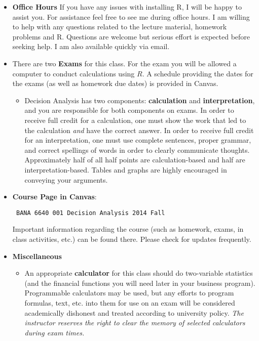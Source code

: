 \documentclass[11pt]{article}
\begin{document}
\begin{itemize}
\item[] \textbf{Office Hours} If you have any issues with installing R, I will be happy to assist you. For assistance feel free to see me during office hours.  I am willing to help with any questions related to the lecture material, homework problems and R. Questions are welcome but serious effort is expected before seeking help.  I am also available quickly via email.  \\

\item[] There are two \textbf{Exams} for this class.  For the exam you will be allowed a computer to conduct calculations using $R$. A schedule providing the dates for the exams (as well as homework due dates) is provided in Canvas.
\begin{itemize} \itemsep 0.2cm
\item Decision Analysis has two components: \textbf{calculation} and \textbf{interpretation}, and you are responsible for both components on exams. In
order to receive full credit for a calculation, one must show the
work that led to the calculation \emph{and} have the correct answer.
In order to receive full credit for an interpretation, one must use
complete sentences, proper grammar, and correct spellings of words
in order to clearly communicate thoughts.  Approximately half of all
half points are calculation-based and half are interpretation-based.  Tables and graphs are highly encouraged in conveying your arguments.
\end{itemize}



\item[] \textbf{Course Page in Canvas}: 
\begin{center}
\texttt{ BANA 6640 001 Decision Analysis 2014 Fall}
\end{center}

\noindent Important information regarding the course (such as homework, exams, in class activities, etc.) can be found there. Please check for updates
frequently. \\[.15cm]


\item[] \textbf{{\large Miscellaneous}}

\begin{itemize} \itemsep .1in
\item  An appropriate \textbf{calculator} for this
class should do two-variable statistics (and the financial functions
you will need later in your business program).  Programmable calculators may be used, but any
efforts to program formulas, text, etc.  into them for use on an
exam will be considered academically dishonest and treated according
to university policy.  \emph{The instructor reserves the right to clear the memory
of selected calculators during exam times.}


\end{itemize}
\end{itemize}
\end{document}
